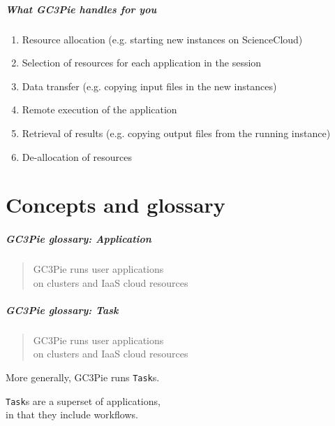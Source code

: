 \documentclass[english,serif,mathserif,xcolor=pdftex,dvipsnames,table]{beamer}
\begin{document}




\begin{frame}
  \frametitle{What GC3Pie handles for you}

  \begin{enumerate}\small
  \item Resource allocation (e.g. starting new instances on
    ScienceCloud)
  \item Selection of resources for each application in the session
  \item Data transfer (e.g. copying input files in the new instances)
  \item Remote execution of the application
  \item Retrieval of results (e.g. copying output files from the
    running instance)
  \item De-allocation of resources
  \end{enumerate}

\end{frame}


\part{Concepts and glossary}

\begin{frame}
  \frametitle{GC3Pie glossary: Application}
  \begin{quote}
    GC3Pie runs \alert<2-3>{user applications}
    \\
    on clusters and IaaS cloud resources
  \end{quote}

\end{frame}


\begin{frame}
  \frametitle{GC3Pie glossary: Task}
  \begin{quote}
    GC3Pie \alert{runs} user applications
    \\
    on clusters and IaaS cloud resources
  \end{quote}

  \+ More generally, GC3Pie runs \texttt{Task}s.

  \+ \texttt{Task}s are a superset of applications,
  \\ in that they include workflows.
\end{frame}
\end{document}
